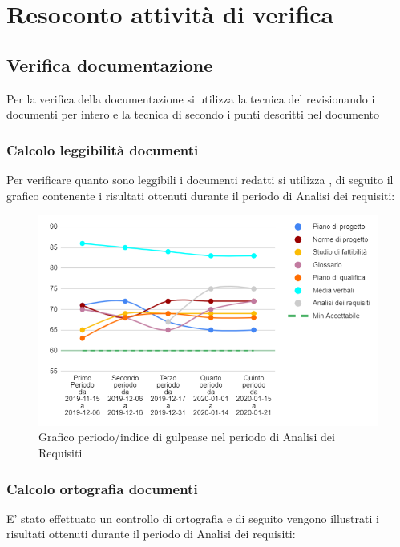 \section{Resoconto attività di verifica}

\subsection{Verifica documentazione}
Per la verifica della documentazione si utilizza la tecnica del  revisionando i documenti per intero e la tecnica di  secondo i punti descritti nel documento 

\subsubsection{Calcolo leggibilità documenti}
Per verificare quanto sono leggibili i documenti redatti si utilizza , di seguito il grafico contenente i risultati ottenuti durante il periodo di Analisi dei requisiti:

\begin{figure}[H]
	\centering
	\includegraphics[width=0.8\linewidth]{./res/images/gulpease.png}
	\caption{Grafico periodo/indice di gulpease nel periodo di Analisi dei Requisiti}
	\label{fig:Grafico indice di gulpease periodo di Analisi dei Requisiti}
\end{figure}

\subsubsection{Calcolo ortografia documenti}
E' stato effettuato un controllo di ortografia e di seguito vengono illustrati i risultati ottenuti durante il periodo di Analisi dei requisiti:

